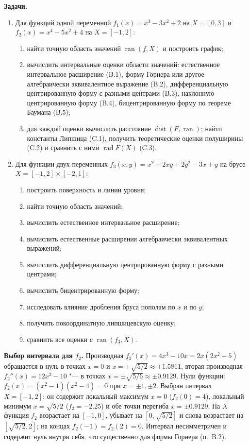 \documentclass[12pt,a4paper]{article}
\newcommand{\ran}{\operatorname{ran}}
\newcommand{\rad}{\operatorname{rad}}
\newcommand{\dist}{\operatorname{dist}}
\begin{document}
\textbf{Задачи.}
\begin{enumerate}
\item Для функций одной переменной $f_1(x)=x^3-3x^2+2$ на $X=[0,3]$ и $f_2(x)=x^4-5x^2+4$ на $X=[-1,2]$:
  \begin{enumerate}[label=\Alph*.]
  \item найти точную область значений $\ran(f,X)$ и построить график;
  \item вычислить интервальные оценки области значений: естественное интервальное расширение (B.1), форму Горнера или другое алгебраически эквивалентное выражение (B.2), дифференциальную центрированную форму с разными центрами (B.3), наклонную центрированную форму (B.4), бицентрированную форму по теореме Баумана (B.5);
  \item для каждой оценки вычислить расстояние $\dist(F,\ran)$; найти константы Липшица (C.1), получить теоретические оценки полуширины (C.2) и сравнить с ними $\rad F(X)$ (C.3).
  \end{enumerate}
\item Для функции двух переменных $f_3(x,y)=x^2+2xy+2y^2-3x+y$ на брусе $X=[-1,2]\times[-2,1]$:
  \begin{enumerate}[label=E.\arabic*]
  \item построить поверхность и линии уровня;
  \item найти точную область значений;
  \item вычислить естественное интервальное расширение;
  \item вычислить естественные расширения алгебраически эквивалентных выражений;
  \item вычислить дифференциальную центрированную форму с разными центрами;
  \item вычислить бицентрированную форму;
  \item исследовать влияние дробления бруса пополам по $x$ и по $y$;
  \item получить покоординатную липшицевскую оценку;
  \item сравнить все оценки с $\ran(f_3,X)$.
  \end{enumerate}
\end{enumerate}

\textbf{Выбор интервала для $f_2$.} Производная $f_2'(x)=4x^3-10x=2x(2x^2-5)$ обращается в нуль в точках $x=0$ и $x=\pm\sqrt{5/2}\approx\pm1.5811$, вторая производная $f_2''(x)=12x^2-10$ "--- в точках $x=\pm\sqrt{5/6}\approx\pm0.9129$. Нули функции: $f_2(x)=(x^2-1)(x^2-4)=0$ при $x=\pm1,\pm2$. Выбран интервал $X=[-1,2]$: он содержит локальный максимум $x=0$ ($f_2(0)=4$), локальный минимум $x=\sqrt{5/2}$ ($f_2=-2.25$) и обе точки перегиба $x=\pm0.9129$. На $X$ функция $f_2$ возрастает на $[-1,0]$, убывает на $[0,\sqrt{5/2}]$ и снова возрастает на $[\sqrt{5/2},2]$; на концах $f_2(-1)=f_2(2)=0$. Интервал несимметричен и содержит нуль внутри себя, что существенно для формы Горнера (п.~B.2).
\end{document}
